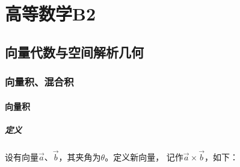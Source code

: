 \documentclass[
	11pt, %
	a4paper, %
]{WhuSakuraBook}
\begin{document}
\tableofcontents %



\pagestyle{fancy} %

\cleardoublepage %


\part{高等数学B2}


\chapterspaceabove{6.75cm} %
\chapterspacebelow{7.25cm} %


\chapter{向量代数与空间解析几何}

\section{向量积、混合积}

\subsection{向量积}

\subsubsection{定义}

    设有向量\(\overrightarrow{a}\)、\(\overrightarrow{b}\)，其夹角为\(\theta\)。定义新向量，
    记作\(\overrightarrow{a} \times \overrightarrow{b}\)，如下：
\end{document}
